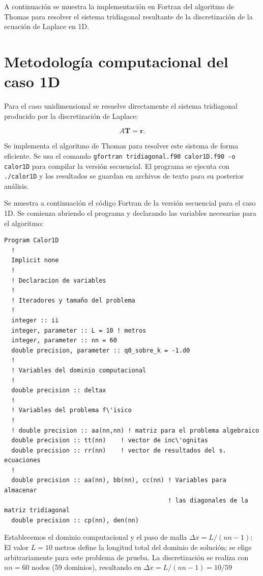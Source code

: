 \documentclass[11pt,a4paper]{article}
\begin{document}
A continuaci\'on se muestra la implementaci\'on en Fortran del algoritmo de 
Thomas para resolver el sistema tridiagonal resultante de la discretizaci\'on 
de la ecuaci\'on de Laplace en 1D.

\section{Metodolog\'ia computacional del caso 1D}

Para el caso unidimensional se resuelve directamente el sistema tridiagonal
producido por la discretizaci\'on de Laplace:

\begin{equation}
A\mathbf{T}=\mathbf{r}.
\end{equation}

Se implementa el algoritmo de Thomas para resolver este sistema de forma 
eficiente. Se usa el comando \verb|gfortran tridiagonal.f90 calor1D.f90 -o calor1D| 
para compilar la versi\'on secuencial. El programa se ejecuta con \verb|./calor1D| 
y los resultados se guardan en archivos de texto para su posterior an\'alisis.

\medskip{}

Se muestra a continuaci\'on el c\'odigo Fortran de la versi\'on secuencial 
para el caso 1D. Se comienza abriendo el programa y declarando las variables 
necesarias para el algoritmo:

\begin{verbatim}
Program Calor1D
  !
  Implicit none
  !
  ! Declaracion de variables
  !
  ! Iteradores y tamaño del problema
  !
  integer :: ii
  integer, parameter :: L = 10 ! metros
  integer, parameter :: nn = 60
  double precision, parameter :: q0_sobre_k = -1.d0
  !
  ! Variables del dominio computacional
  !
  double precision :: deltax
  !
  ! Variables del problema f\'isico
  !
  ! double precision :: aa(nn,nn) ! matriz para el problema algebraico
  double precision :: tt(nn)    ! vector de inc\'ognitas
  double precision :: rr(nn)    ! vector de resultados del s. ecuaciones
  !
  double precision :: aa(nn), bb(nn), cc(nn) ! Variables para almacenar
                                             ! las diagonales de la matriz tridiagonal
  double precision :: cp(nn), den(nn)
\end{verbatim}

Establecemos el dominio computacional y el paso de malla $ \Delta x = L/(nn - 1)$:
El valor $L=10$ metros define la longitud total del dominio de soluci\'on; se elige
arbitrariamente para este problema de prueba. La discretizaci\'on se realiza 
con $nn=60$ nodos (59 dominios), resultando en $ \Delta x = L/(nn-1) = 10/59 $
\end{document}
